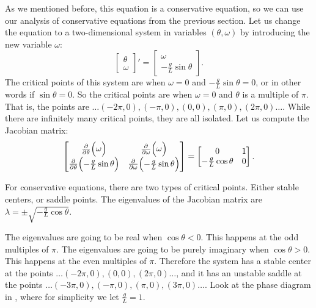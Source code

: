 \begin{mywrapfigsimp}{1.45in}{1.75in}
\noindent
{}
\end{mywrapfigsimp}
As we mentioned before, this equation is a conservative
equation, so we can use our analysis of conservative equations
from the previous section.
Let us change the equation to a two-dimensional
system in variables $(\theta,\omega)$ by introducing the new
variable $\omega$:
\begin{equation*}
\begin{bmatrix}
\theta \\ \omega
\end{bmatrix} '
=
\begin{bmatrix}
\omega \\
- \frac{g}{L} \sin \theta
\end{bmatrix} .
\end{equation*}
The critical points of this system are when $\omega = 0$ and $-\frac{g}{L}
\sin \theta = 0$, or in other words if $\sin \theta = 0$.  So the critical
points are when $\omega = 0$ and $\theta$ is a multiple of $\pi$.  That is,
the points are $\ldots (-2\pi,0), (-\pi,0), (0,0), (\pi,0), (2\pi,0)
\ldots$.  While there are infinitely many critical points, they are all isolated.
Let us compute the Jacobian matrix:
\begin{equation*}
\begin{bmatrix}
\frac{\partial}{\partial \theta} \Bigl( \omega \Bigr) & 
\frac{\partial}{\partial \omega} \Bigl( \omega \Bigr) \\
\frac{\partial}{\partial \theta} \Bigl( - \frac{g}{L} \sin \theta \Bigr) & 
\frac{\partial}{\partial \omega} \Bigl( - \frac{g}{L} \sin \theta \Bigr)
\end{bmatrix}
=
\begin{bmatrix}
0 & 1 \\
- \frac{g}{L} \cos \theta & 0
\end{bmatrix} .
\end{equation*}

For conservative equations, there are two types of
critical points.  Either stable centers, or saddle points.  The eigenvalues
of the Jacobian matrix are $\lambda = \pm \sqrt{-\frac{g}{L}\cos \theta}$.

The
eigenvalues are going to be real when $\cos \theta < 0$.  This happens at the odd multiples of $\pi$.
The
eigenvalues are going to be purely imaginary 
when $\cos \theta > 0$.  This happens at the even
multiples of $\pi$.  Therefore the system has a stable center at
the points $\ldots (-2\pi,0), (0,0), (2\pi,0) \ldots$, and it has an
unstable saddle at
the points $\ldots (-3\pi,0), (-\pi,0), (\pi,0), (3\pi,0) \ldots$.  Look at the
phase diagram in ,
where for simplicity we let $\frac{g}{L} = 1$.


